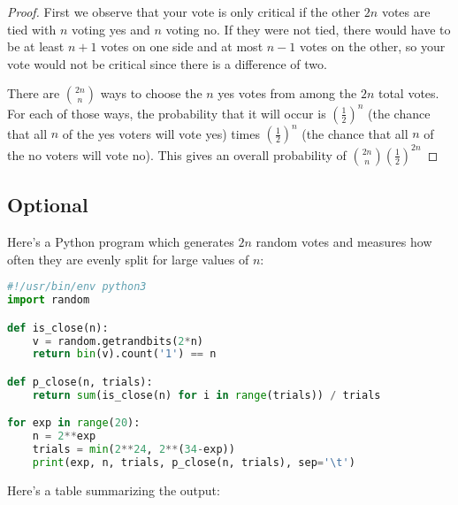 \documentclass[12pt]{article}
\begin{document}
\begin{proof}
First we observe that your vote is only critical if the other $2n$ votes
are tied with $n$ voting yes and $n$ voting no. If they were not tied, there
would have to be at least $n+1$ votes on one side and at most $n-1$ votes on
the other, so your vote would not be critical since there is a difference of
two. 

There are $\binom{2n}{n}$ ways to choose the $n$ yes votes from among the $2n$
total votes. For each of those ways, the probability that it will occur is
$(\frac{1}{2})^n$ (the chance that all $n$ of the yes voters will vote yes)
times $(\frac{1}{2})^n$ (the chance that all $n$ of the no voters will vote
no). This gives an overall probability of $\binom{2n}{n}(\frac{1}{2})^{2n}$
\end{proof}

\subsection*{Optional}
Here's a Python program which generates $2n$ random votes and measures how often they are evenly split for large values of $n$:
\begin{center}
\begin{lstlisting}[language=Python]
#!/usr/bin/env python3
import random

def is_close(n):
    v = random.getrandbits(2*n)
    return bin(v).count('1') == n

def p_close(n, trials):
    return sum(is_close(n) for i in range(trials)) / trials

for exp in range(20):
    n = 2**exp
    trials = min(2**24, 2**(34-exp))
    print(exp, n, trials, p_close(n, trials), sep='\t')
\end{lstlisting}
\end{center}

\noindent Here's a table summarizing the output:
\end{document}
